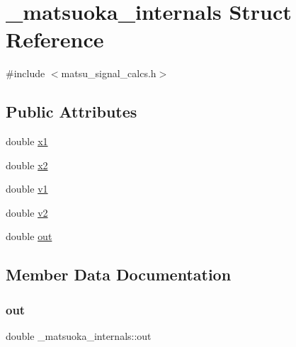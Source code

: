 \hypertarget{struct__matsuoka__internals}{}\section{\+\_\+matsuoka\+\_\+internals Struct Reference}
\label{struct__matsuoka__internals}


{\ttfamily \#include $<$matsu\+\_\+signal\+\_\+calcs.\+h$>$}

\subsection*{Public Attributes}
\begin{DoxyCompactItemize}
\item 
double \mbox{\hyperlink{struct__matsuoka__internals_a6f5497b0eabe8a0a644ef37b7db89baf}{x1}}
\item 
double \mbox{\hyperlink{struct__matsuoka__internals_ab23ab0f50b3bb8250da083b0fd49cb05}{x2}}
\item 
double \mbox{\hyperlink{struct__matsuoka__internals_a3f876d60f71bd25555ba150cd73569ab}{v1}}
\item 
double \mbox{\hyperlink{struct__matsuoka__internals_afb33a7237b71962822b08c2e53f724a1}{v2}}
\item 
double \mbox{\hyperlink{struct__matsuoka__internals_a16f7d3a0a567f660d89d10b1ef6a2d9c}{out}}
\end{DoxyCompactItemize}


\subsection{Member Data Documentation}
\mbox{\label{struct__matsuoka__internals_a16f7d3a0a567f660d89d10b1ef6a2d9c}} 
\subsubsection{\texorpdfstring{out}{out}}
{\footnotesize\ttfamily double \+\_\+matsuoka\+\_\+internals\+::out}

\mbox{\label{struct__matsuoka__internals_a3f876d60f71bd25555ba150cd73569ab}} 
